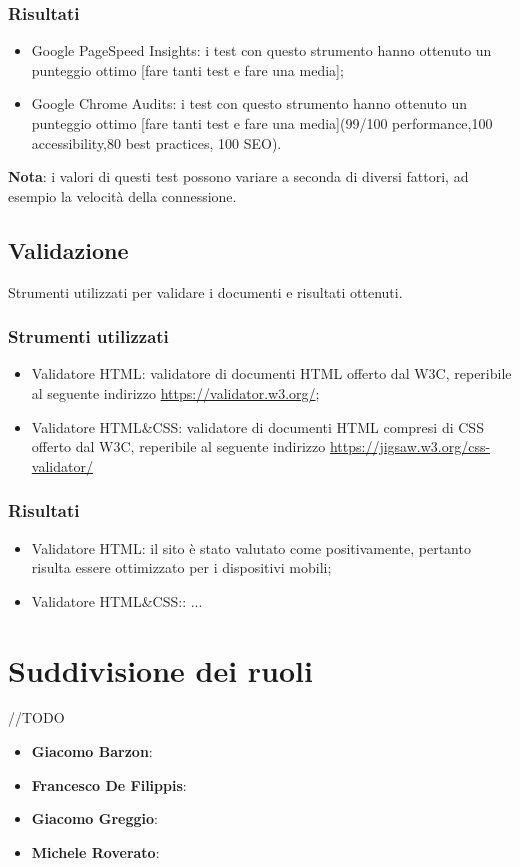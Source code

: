 \documentclass[12pt]{article}
\begin{document}
	\subsubsection{Risultati}
		\begin{itemize}
			\item Google PageSpeed Insights: i test con questo strumento hanno ottenuto un punteggio ottimo [fare tanti test e fare una media];
			\item Google Chrome Audits: i test con questo strumento hanno ottenuto un punteggio ottimo [fare tanti test e fare una media](99/100 performance,100 accessibility,80 best practices, 100 SEO).
		\end{itemize}
	\textbf{Nota}: i valori di questi test possono variare a seconda di diversi fattori, ad esempio la velocità della connessione.
	\subsection{Validazione}
	Strumenti utilizzati per validare i documenti e risultati ottenuti.
	\subsubsection{Strumenti utilizzati}
	\begin{itemize}
		\item Validatore HTML: validatore di documenti HTML offerto dal W3C, reperibile al seguente indirizzo \url{https://validator.w3.org/};
		\item Validatore HTML\&CSS: validatore di documenti HTML compresi di CSS offerto dal W3C, reperibile al seguente indirizzo \url{https://jigsaw.w3.org/css-validator/}
	\end{itemize}
	\subsubsection{Risultati}
		\begin{itemize}
			\item Validatore HTML: il sito è stato valutato come positivamente, pertanto risulta essere ottimizzato per i dispositivi mobili;
			\item Validatore HTML\&CSS:: ...
		\end{itemize}
	
	\section{Suddivisione dei ruoli}
	//TODO
	\begin{itemize}
		\item \textbf{Giacomo Barzon}:
		\item \textbf{Francesco De Filippis}: 
		\item \textbf{Giacomo Greggio}:
		\item \textbf{Michele Roverato}:
	\end{itemize}
\end{document}
